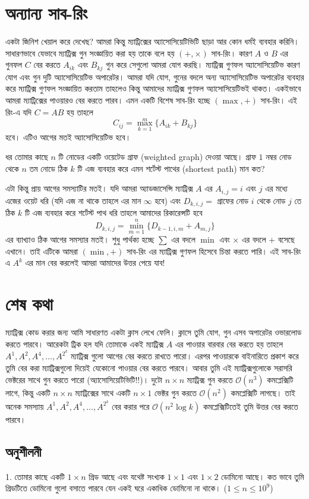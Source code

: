 \section{অন্যান্য সাব-রিং}
একটা জিনিশ খেয়াল করে দেখেছ? আমরা কিন্তু ম্যাট্রিক্সের অ্যাসোসিয়েটিভিটি ছাড়া আর কোন ধর্মই ব্যবহার করিনি। সাধারণভাবে যেভাবে ম্যাট্রিক্স গুন সংজ্ঞায়িত করা হয় তাকে বলে হয় $(+, \times)$ সাব-রিং। কারণ  $A$ ও $B$ এর গুনফল $C$ বের করতে $A_{ik}$ এবং $B_{kj}$ গুন করে সেগুলো আমরা যোগ করছি। ম্যাট্রিক্স গুণফল  অ্যাসোসিয়েটিভ কারণ যোগ এবং গুন দুটি অ্যাসোসিয়েটিভ অপারেটর। আমরা যদি যোগ, গুনের বদলে অন্য অ্যাসোসিয়েটিভ অপারেটর ব্যবহার করে ম্যাট্রিক্স গুণফল সংজ্ঞায়িত করতাম তাহলেও কিন্তু আমাদের ম্যাট্রিক্স গুণফল অ্যাসোসিয়েটিভই থাকত। একইভাবে আমরা ম্যাট্রিক্সের পাওয়ারও বের করতে পারব। এমন একটি বিশেষ সাব-রিং হচ্ছে $(\max, +)$ সাব-রিং। এই রিং-এ যদি $C = AB$ হয় তাহলে
$$C_{ij} = \max_{k = 1}^m \lbrace A_{ik} + B_{kj} \rbrace$$
হবে। এটিও আগের মতই অ্যাসোসিয়েটিভ হবে।
\begin{problem}
ধর তোমার কাছে $n$ টি নোডের একটি ওয়েটেড গ্রাফ (weighted graph) দেওয়া আছে। গ্রাফ $1$ নম্বর নোড থেকে $n$ তম নোডে ঠিক $k$ টি এজ ব্যবহার করে এমন শর্টেস্ট পাথের (shortest path) মান কত?
\end{problem}
\begin{solution}
এটা কিন্তু প্রায় আগের সমস্যাটির মতই। যদি আমরা অ্যাডজাসেন্সি ম্যাট্রিক্স $A$ এর $A_{i, j} = i$ এবং $j$ এর মধ্যে এজের ওয়েট ধরি (যদি এজ না থাকে তাহলে এর মান $\infty$ হবে) এবং  $D_{k, i, j} = $ গ্রাফের নোড $i$ থেকে নোড $j$ তে ঠিক $k$ টি এজ ব্যবহার করে শর্টেস্ট পাথ ধরি তাহলে আমাদের রিকারেন্সটি হবে
$$ D_{k, i, j} = \min_{m = 1}^{n} \lbrace D_{k - 1, i, m} + A_{m, j} \rbrace$$
এর ব্যাখ্যাও ঠিক আগের সমস্যার মতই। শুধু পার্থক্য হচ্ছে $\sum$ এর বদলে $\min$ এবং $\times$ এর বদলে $+$ বসেছে এখানে। তাই এটিকে আমরা $(\min, +)$ সাব-রিং এর ম্যাট্রিক্স গুণফল হিসেবে চিন্তা করতে পারি। এই সাব-রিং এ $A^{k}$ এর মান বের করলেই আমরা আমাদের উত্তর পেয়ে যাব!
\end{solution}

\section{শেষ কথা}
ম্যাট্রিক্স কোড করার জন্য আমি সাধারণত একটা ক্লাস লেখে ফেলি। ক্লাসে তুমি যোগ, গুন এসব অপারেটর ওভারলোড করতে পারবে। আরেকটা ট্রিক হল যদি তোমাকে একই ম্যাট্রিক্স $A$ এর পাওয়ার বারবার বের করতে হয় তাহলে $A^1, A^2, A^4, \dots, A^{2^k}$ ম্যাট্রিক্স গুলো আগের বের করতে রাখতে পারো। এরপর পাওয়ারকে বাইনারিতে প্রকাশ করে তুমি বের করা ম্যাট্রিক্সগুলো দিয়েই যেকোনো পাওয়ার বের করতে পারবে। আবার তুমি এই ম্যাট্রিক্সগুলোকে সরাসরি ভেক্টরের সাথে গুন করতে পারো (অ্যাসোসিয়েটিভিটি!!)।  দুটো $n \times n$ ম্যাট্রিক্স গুন করতে $\mathcal{O}(n^3)$ কমপ্লেক্সিটি লাগে, কিন্তু একটি $n \times n$ ম্যাট্রিক্সের সাথে একটি $n \times 1$ ভেক্টর গুন করতে $\mathcal{O}(n^2)$ কমপ্লেক্সিটি লাগছে। তাই অনেক সমস্যায় $A^1, A^2, A^4, \dots, A^{2^k}$ বের করার পরে $\mathcal{O}(n^2 \log{k})$ কমপ্লেক্সিটিতেই তুমি উত্তর বের করতে পারবে।

\newpage

\subsection*{অনুশীলনী}
1. তোমার কাছে একটি $1 \times n$ গ্রিড আছে এবং যথেষ্ট সংখ্যক $1 \times 1$ এবং $1 \times 2$ ডোমিনো আছে। কত ভাবে তুমি গ্রিডটিতে ডোমিনো গুলো বসাতে পারবে যেন একই ঘরে একাধিক ডোমিনো না থাকে। ($1 \leq n \leq 10^{9}$)
